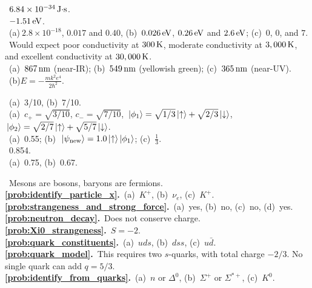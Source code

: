 \medskip


~$6.84 \times 10^{-34}\,\mbox{J$\cdot$s}$.\\
~$-1.51\,\mbox{eV}$.\\
~(a)$~2.8\times 10^{-18}$, $0.017$ and $0.40$, 
(b)~$0.026\,\mbox{eV}$, $0.26\,\mbox{eV}$ and $2.6\,\mbox{eV}$;
(c)~$0$, $0$, and $7$.\\
~Would expect poor conductivity at $300\,\mbox{K}$, 
moderate conductivity at $3,000\,\mbox{K}$, and
excellent conductivity at $30,000\,\mbox{K}$.\\
~(a)~$867\,\mbox{nm}$ (near-IR); 
(b)~$549\,\mbox{nm}$ (yellowish green); (c)~$365\,\mbox{nm}$ (near-UV).\\
~(b)$E = -\frac{mk^2e^4}{2\hbar^2}$.

\medskip


~(a)~3/10, (b)~7/10.\\
~(a)~$c_+=\sqrt{3/10}$, $c_-=\sqrt{7/10}$,
$\,|\mbox{$\phi_1$}\rangle = \sqrt{1/3}\,|\mbox{$\uparrow$}\rangle + \sqrt{2/3}\,|\mbox{$\downarrow$}\rangle$,
$\,|\mbox{$\phi_2$}\rangle = \sqrt{2/7}\,|\mbox{$\uparrow$}\rangle + \sqrt{5/7}\,|\mbox{$\downarrow$}\rangle$.\\
~(a)~0.55; 
(b)~$\,|\mbox{$\psi_\text{new}$}\rangle = 1.0\,|\mbox{$\uparrow$}\rangle\,|\mbox{$\phi_1$}\rangle$;
(c)~$\frac{1}{3}$.\\
~0.854.\\
~(a)~0.75, (b)~0.67.\\

\medskip



~Mesons are bosons, baryons are fermions.\\
{\bf \ref{prob:identify_particle_x}.}~(a)~$K^+$, (b)~$\nu_e$, (c)~$K^+$.\\
{\bf \ref{prob:strangeness_and_strong_force}.}~(a)~yes, (b)~no, (c)~no, (d)~yes.\\
{\bf \ref{prob:neutron_decay}.}~Does not conserve charge.\\
{\bf \ref{prob:Xi0_strangeness}.}~$S=-2$.\\
{\bf \ref{prob:quark_constituents}.}~(a)~$uds$, (b)~$dss$, (c)~$u\bar d$.\\
{\bf \ref{prob:quark_model}.}~This requires two $s$-quarks, with total charge $-2/3$.  No single quark can add $q=5/3$.\\
{\bf \ref{prob:identify_from_quarks}.}~(a)~$n$ or $\Delta ^0$, (b)~$\Sigma^+$ or $\Sigma^{*+}$, (c)~$K^0$.

